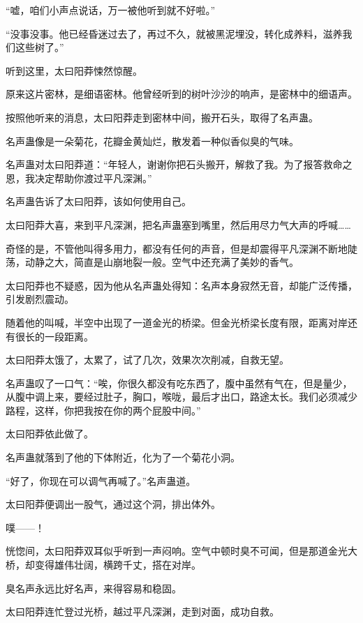 \begin{this_body}
“嘘，咱们小声点说话，万一被他听到就不好啦。”

“没事没事。他已经昏迷过去了，再过不久，就被黑泥埋没，转化成养料，滋养我们这些树了。”

听到这里，太曰阳莽悚然惊醒。

原来这片密林，是细语密林。他曾经听到的树叶沙沙的响声，是密林中的细语声。

按照他听来的消息，太曰阳莽走到密林中间，搬开石头，取得了名声蛊。

名声蛊像是一朵菊花，花瓣金黄灿烂，散发着一种似香似臭的气味。

名声蛊对太曰阳莽道：“年轻人，谢谢你把石头搬开，解救了我。为了报答救命之恩，我决定帮助你渡过平凡深渊。”

名声蛊告诉了太曰阳莽，该如何使用自己。

太曰阳莽大喜，来到平凡深渊，把名声蛊塞到嘴里，然后用尽力气大声的呼喊……

奇怪的是，不管他叫得多用力，都没有任何的声音，但是却震得平凡深渊不断地陡荡，动静之大，简直是山崩地裂一般。空气中还充满了美妙的香气。

太曰阳莽也不疑惑，因为他从名声蛊处得知：名声本身寂然无音，却能广泛传播，引发剧烈震动。

随着他的叫喊，半空中出现了一道金光的桥梁。但金光桥梁长度有限，距离对岸还有很长的一段距离。

太曰阳莽太饿了，太累了，试了几次，效果次次削减，自救无望。

名声蛊叹了一口气：“唉，你很久都没有吃东西了，腹中虽然有气在，但是量少，从腹中调上来，要经过肚子，胸口，喉咙，最后才出口，路途太长。我们必须减少路程，这样，你把我按在你的两个屁股中间。”

太曰阳莽依此做了。

名声蛊就落到了他的下体附近，化为了一个菊花小洞。

“好了，你现在可以调气再喊了。”名声蛊道。

太曰阳莽便调出一股气，通过这个洞，排出体外。

噗——！

恍惚间，太曰阳莽双耳似乎听到一声闷响。空气中顿时臭不可闻，但是那道金光大桥，却变得雄伟壮阔，横跨千丈，搭在对岸。

臭名声永远比好名声，来得容易和稳固。

太曰阳莽连忙登过光桥，越过平凡深渊，走到对面，成功自救。

\end{this_body}

